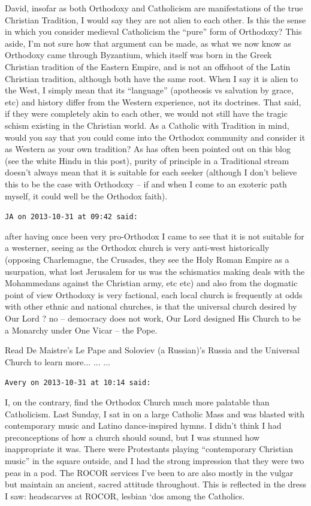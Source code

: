 \begin{footnotesize}
\begin{sffamily}
David, insofar as both Orthodoxy and Catholicism are manifestations of the true Christian Tradition, I would say they are not alien to each other. Is this the sense in which you consider medieval Catholicism the ``pure'' form of Orthodoxy? This aside, I'm not sure how that argument can be made, as what we now know as Orthodoxy came through Byzantium, which itself was born in the Greek Christian tradition of the Eastern Empire, and is not an offshoot of the Latin Christian tradition, although both have the same root. When I say it is alien to the West, I simply mean that its ``language'' (apotheosis vs salvation by grace, etc) and history differ from the Western experience, not its doctrines. That said, if they were completely akin to each other, we would not still have the tragic schism existing in the Christian world. As a Catholic with Tradition in mind, would you say that you could come into the Orthodox community and consider it as Western as your own tradition? As has often been pointed out on this blog (see the white Hindu in this post), purity of principle in a Traditional stream doesn't always mean that it is suitable for each seeker (although I don't believe this to be the case with Orthodoxy -- if and when I come to an exoteric path myself, it could well be the Orthodox faith).

\hfill

\texttt{JA on 2013-10-31 at 09:42 said:}

after having once been very pro-Orthodox I came to see that it is not suitable for a westerner, seeing as the Orthodox church is very anti-west historically (opposing Charlemagne, the Crusades, they see the Holy Roman Empire as a usurpation, what lost Jerusalem for us was the schismatics making deals with the Mohammedans against the Christian army, etc etc) and also from the dogmatic point of view Orthodoxy is very factional, each local church is frequently at odds with other ethnic and national churches, is that the universal church desired by Our Lord ? no -- democracy does not work, Our Lord designed His Church to be a Monarchy under One Vicar -- the Pope.

Read De Maistre's Le Pape and Soloviev (a Russian)'s Russia and the Universal Church to learn more... ... ... 

\hfill

\texttt{Avery on 2013-10-31 at 10:14 said:}

I, on the contrary, find the Orthodox Church much more palatable than Catholicism. Last Sunday, I sat in on a large Catholic Mass and was blasted with contemporary music and Latino dance-inspired hymns. I didn't think I had preconceptions of how a church should sound, but I was stunned how inappropriate it was. There were Protestants playing ``contemporary Christian music'' in the square outside, and I had the strong impression that they were two peas in a pod. The ROCOR services I've been to are also mostly in the vulgar but maintain an ancient, sacred attitude throughout. This is reflected in the dress I saw: headscarves at ROCOR, lesbian `dos among the Catholics.


\end{sffamily}
\end{footnotesize}
